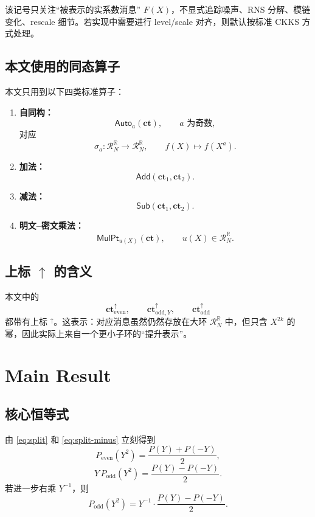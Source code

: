 \documentclass[11pt,a4paper]{ctexart}
\newcommand{\RR}{\mathbb{R}}
\newcommand{\Rbig}{\mathcal{R}_N^{\RR}}
\newcommand{\Auto}[1]{\mathsf{Auto}_{#1}}
\newcommand{\Add}{\mathsf{Add}}
\newcommand{\Sub}{\mathsf{Sub}}
\newcommand{\MulPt}[1]{\mathsf{MulPt}_{#1}}
\newcommand{\cte}{\mathbf{ct}_{\mathrm{even}}^{\uparrow}}
\newcommand{\ctoy}{\mathbf{ct}_{\mathrm{odd},Y}^{\uparrow}}
\newcommand{\cto}{\mathbf{ct}_{\mathrm{odd}}^{\uparrow}}
\newcommand{\Pe}{P_{\mathrm{even}}}
\newcommand{\Po}{P_{\mathrm{odd}}}
\begin{document}
该记号只关注“被表示的实系数消息” \(F(X)\)，不显式追踪噪声、RNS 分解、模链变化、rescale 细节。若实现中需要进行 level/scale 对齐，则默认按标准 CKKS 方式处理。

\subsection{本文使用的同态算子}

本文只用到以下四类标准算子：

\begin{enumerate}[label=(\roman*)]
    \item \textbf{自同构：}
    \[
    \Auto{a}(\mathbf{ct}),
    \qquad a \text{ 为奇数},
    \]
    对应
    \[
    \sigma_a:\Rbig\to\Rbig,\qquad f(X)\mapsto f(X^a).
    \]

    \item \textbf{加法：}
    \[
    \Add(\mathbf{ct}_1,\mathbf{ct}_2).
    \]

    \item \textbf{减法：}
    \[
    \Sub(\mathbf{ct}_1,\mathbf{ct}_2).
    \]

    \item \textbf{明文--密文乘法：}
    \[
    \MulPt{u(X)}(\mathbf{ct}),
    \qquad u(X)\in \Rbig.
    \]
\end{enumerate}

\subsection{上标 \(\uparrow\) 的含义}

本文中的
\[
\cte,\qquad \ctoy,\qquad \cto
\]
都带有上标 \({}^{\uparrow}\)。这表示：对应消息虽然仍然存放在大环 \(\Rbig\) 中，但只含 \(X^{2k}\) 的幂，因此实际上来自一个更小子环的“提升表示”。

\section{Main Result}

\subsection{核心恒等式}

由 \eqref{eq:split} 和 \eqref{eq:split-minus} 立刻得到
\begin{equation}
\Pe(Y^2)=\frac{P(Y)+P(-Y)}{2}, \label{eq:even-formula}
\end{equation}
\begin{equation}
Y\,\Po(Y^2)=\frac{P(Y)-P(-Y)}{2}. \label{eq:odd-formula-y}
\end{equation}
若进一步右乘 \(Y^{-1}\)，则
\begin{equation}
\Po(Y^2)=Y^{-1}\cdot \frac{P(Y)-P(-Y)}{2}. \label{eq:odd-formula}
\end{equation}
\end{document}
